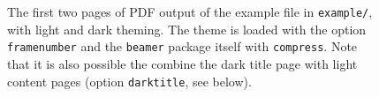 \begin{figure}

\caption{The first two pages of PDF output of the example file in \lstinline!example/!, with light and dark theming. The theme is loaded with the option \lstinline!framenumber! and the \texttt{beamer} package itself with \lstinline!compress!. Note that it is also possible the combine the dark title page with light content pages (option \lstinline!darktitle!, see below).}
\label{fig:example1}
\end{figure}

